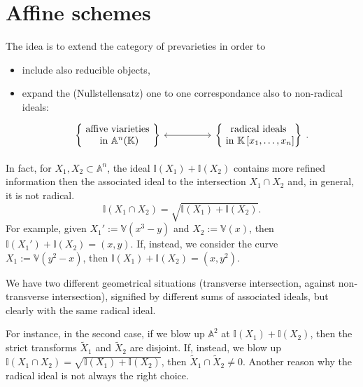 \section{Affine schemes}
The idea is to extend the category of prevarieties in order to
\begin{itemize}
	\item include also reducible objects,
	\item expand the (Nullstellensatz) one to one correspondance also to non-radical ideals:
	\begin{equation}
	\begin{tikzcd}[row sep=tiny]
			\left\{\begin{matrix}
				\text{ affive viarieties }\\
				\text{ in } \mathbb{A}^{n}(\K)
			\end{matrix}\right\} \arrow[rr, "", leftrightarrow] & &
			\left\{  \begin{matrix}
				\text{ radical ideals }\\
				\text{ in } \mathbb{K}\left[x_1, \ldots, x_n \right]\\
			\end{matrix}\right\}
	\end{tikzcd}
	.\end{equation} 
\end{itemize}		
In fact, for $X_1, X_2 \subset \mathbb{A}^{n}$, the ideal $\mathbb{I}\left( X_1 \right) + \mathbb{I}\left( X_2 \right)$
contains more refined information then the associated ideal to the intersection $X_1 \cap X_2$
and, in general, it is not radical.
\begin{equation}
\mathbb{I}\left( X_1 \cap X_2 \right) =
\sqrt{\mathbb{I}\left( X_1 \right) + \mathbb{I}\left( X_2 \right)}
.\end{equation} 
For example, given $X_1' := \mathbb{V}\left( x^3 - y \right)$ and $X_2 := \mathbb{V}\left( x \right)$,
then $\mathbb{I}\left( X_1' \right) + \mathbb{I}\left( X_2 \right) = \left( x,y \right)$.
If, instead, we consider the curve $X_1 := \mathbb{V}\left( y^2 - x \right)$,
then $\mathbb{I}\left( X_1 \right) + \mathbb{I}\left( X_2 \right) = \left( x, y^2 \right)$.

We have two different geometrical situations (transverse intersection, against non-transverse intersection),
signified by different sums of associated ideals, but clearly with the same radical ideal.

For instance, in the second case,
if we blow up $\mathbb{A}^{2}$ at $\mathbb{I}\left( X_1 \right) + \mathbb{I}\left( X_2 \right)$,
then the strict transforms $\widetilde{X}_1$ and $\widetilde{X}_2$ are disjoint.
If, instead, we blow up $\mathbb{I}\left( X_1 \cap X_2 \right) = \sqrt{\mathbb{I}\left( X_1 \right) + \mathbb{I}\left( X_2 \right)}$,
then $\widetilde{X}_1 \cap \widetilde{X}_2 \neq 0$.
Another reason why the radical ideal is not always the right choice.

